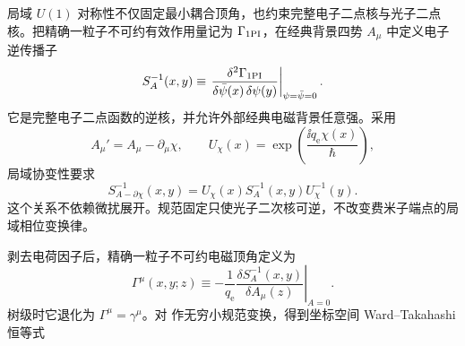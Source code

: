 
局域 $U(1)$ 对称性不仅固定最小耦合顶角，也约束完整电子二点核与光子二点核。把精确一粒子不可约有效作用量记为 $\Gamma_{\rm 1PI}$，在经典背景四势 $A_\mu$ 中定义电子逆传播子
\begin{equation}
{
S_A^{-1}(x,y)
\equiv
\left.
\frac{\delta^2\Gamma_{\rm 1PI}}
{\delta\bar\psi(x)\,\delta\psi(y)}
\right|_{\psi=\bar\psi=0}.}
\label{eq:qed_background_inverse_propagator_definition}
\end{equation}
它是完整电子二点函数的逆核，并允许外部经典电磁背景任意强。采用
\[
A_\mu' = A_\mu-\partial_\mu\chi,
\qquad
U_\chi(x)=\exp\!\left(\frac{\ii q_{\mathrm e}\chi(x)}{\hbar}\right),
\]
局域协变性要求
\begin{equation}
{
S_{A-\partial\chi}^{-1}(x,y)
=U_\chi(x)S_A^{-1}(x,y)U_\chi^{-1}(y).}
\label{eq:qed_inverse_propagator_gauge_covariance}
\end{equation}
这个关系不依赖微扰展开。规范固定只使光子二次核可逆，不改变费米子端点的局域相位变换律。

剥去电荷因子后，精确一粒子不可约电磁顶角定义为
\begin{equation}
{
\Gamma^\mu(x,y;z)
\equiv
-\frac{1}{q_{\mathrm e}}
\left.
\frac{\delta S_A^{-1}(x,y)}{\delta A_\mu(z)}
\right|_{A=0}.}
\label{eq:qed_exact_vertex_functional_definition}
\end{equation}
树级时它退化为 $\Gamma^\mu=\gamma^\mu$。对 作无穷小规范变换，得到坐标空间 Ward--Takahashi 恒等式


